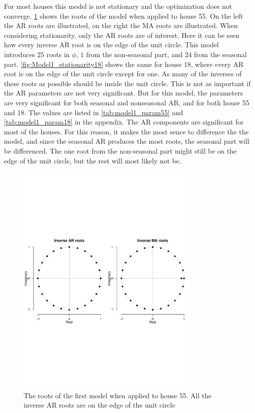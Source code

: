 \noindent For most houses this model is not stationary and the optimization does not converge. \cref{fig:Model1_stationarity} shows the roots of the model when applied to house 55. On the left the AR roots are illustrated, on the right the MA roots are illustrated. When considering stationarity, only the AR roots are of interest. Here it can be seen how every inverse AR root is on the edge of the unit circle. This model introduces $25$ roots in $\phi$, $1$ from the non-seasonal part, and $24$ from the seasonal part. \cref{fig:Model1_stationarity18} shows the same for house 18, where every AR root is on the edge of the unit circle except for one. As many of the inverses of these roots as possible should be inside the unit circle. This is not as important if the AR parameters are not very significant. But for this model, the parameters are very significant for both seasonal and nonseasonal AR, and for both house 55 and 18. The values are listed in \cref{tab:model1_param55} and \cref{tab:model1_param18} in the appendix. The AR components are significant for most of the houses. For this reason, it makes the most sence to difference the the model, and since the seasonal AR produces the most roots, the seasonal part will be differenced. The one root from the non-seasonal part might still be on the edge of the unit circle, but the rest will most likely not be.



\begin{figure}
    \centering
    \includegraphics[width=0.8\textwidth]{../../../figures/arimax/Stationarity_model1.pdf}
    \caption{The roots of the first model when applied to house 55. All the inverse AR roots are on the edge of the unit circle}
    \label{fig:Model1_stationarity}
\end{figure}

